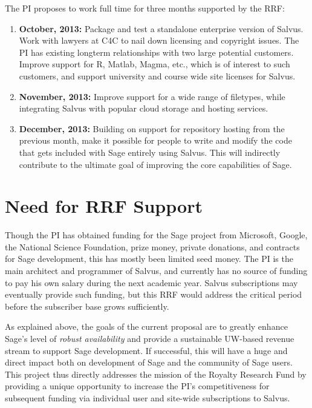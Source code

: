\documentclass[11pt]{article}
\begin{document}
The PI proposes to work full time for three months supported by the RRF:

\begin{enumerate}
\item {\bf October, 2013:} Package and test a standalone enterprise
  version of Salvus.  Work with lawyers at C4C to nail down licensing
  and copyright issues. The PI has existing longterm relationships
  with two large potential customers.  Improve support
  for R, Matlab, Magma, etc., which is of interest to such customers,
  and support university and course wide site licenses for Salvus.

\item {\bf November, 2013:} Improve support for a wide range of
  filetypes, while integrating Salvus with popular cloud storage and
  hosting services.
\item {\bf December, 2013:} Building on support for repository hosting
  from the previous month, make it possible for people to write and
  modify the code that gets included with Sage entirely using Salvus.
  This will indirectly contribute to the ultimate goal of improving
  the core capabilities of Sage.
\end{enumerate}


\section{Need for RRF Support}

Though the PI has obtained funding for the Sage project from
Microsoft, Google, the National Science Foundation, prize money,
private donations, and contracts for Sage development, this has mostly
been limited seed money.  The PI is the main architect and programmer
of Salvus, and currently has no source of funding to pay his own
salary during the next academic year.  Salvus subscriptions may
eventually provide such funding, but this RRF would address the
critical period before the subscriber base grows sufficiently.


As explained above, the goals of the current proposal are to greatly enhance Sage's level
of {\em robust availability} and provide a sustainable UW-based
revenue stream to support Sage development.  If successful, this will
have a huge and direct impact both on development of Sage and the
community of Sage users.  This project thus directly addresses the
mission of the Royalty Research Fund by providing a unique opportunity
to increase the PI's competitiveness for subsequent funding via
individual user and site-wide subscriptions to Salvus.
\end{document}
